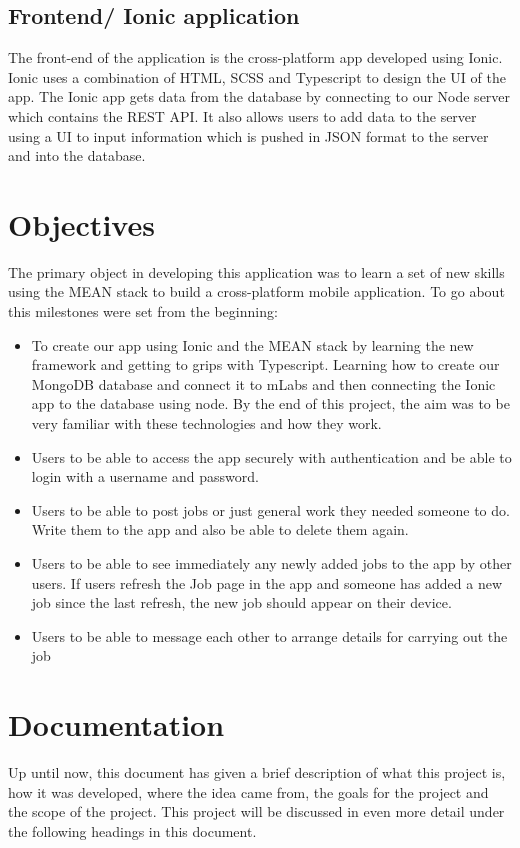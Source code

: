 \subsection{Frontend/ Ionic application}
The front-end of the application is the cross-platform app developed using Ionic. Ionic uses a combination of HTML, SCSS and Typescript to design the UI of the app. The Ionic app gets data from the database by connecting to our Node server which contains the REST API. It also allows users to add data to the server using a UI to input information which is pushed in JSON format to the server and into the database.

\section{Objectives}

The primary object in developing this application was to learn a set of new skills using the MEAN stack to build a cross-platform mobile application. To go about this milestones were set from the beginning:
\begin{itemize}
\item To create our app using Ionic and the MEAN stack by learning the new framework and getting to grips with Typescript. Learning how to create our MongoDB database and connect it to mLabs and then connecting the Ionic app to the database using node. By the end of this project, the aim was to be very familiar with these technologies and how they work.
\item Users to be able to access the app securely with authentication and be able to login with a username and password.
\item Users to be able to post jobs or just general work they needed someone to do. Write them to the app and also be able to delete them again.
\item Users to be able to see immediately any newly added jobs to the app by other users. If users refresh the Job page in the app and someone has added a new job since the last refresh, the new job should appear on their device. 
\item Users to be able to message each other to arrange details for carrying out the job
\end{itemize}


\section{Documentation}
Up until now, this document has given a brief description of what this project is, how it was developed, where the idea came from, the goals for the project and the scope of the project. This project will be discussed in even more detail under the following headings in this document. 


